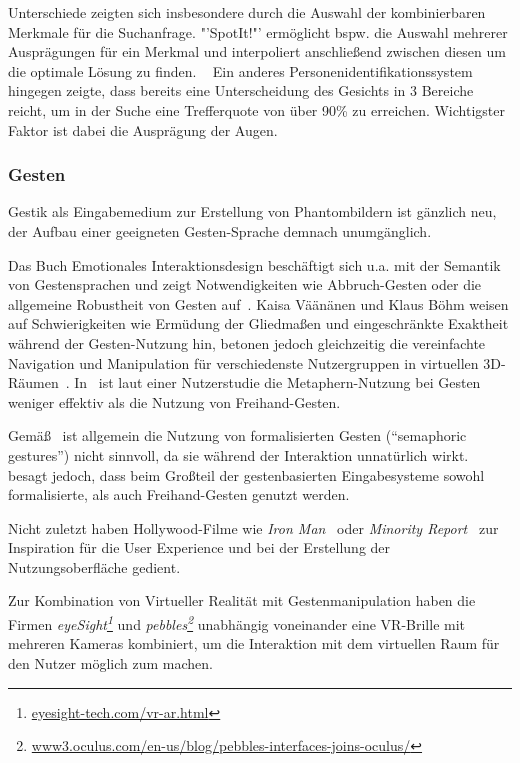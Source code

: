 \documentclass{sigchi-ext}
\begin{document}
Unterschiede zeigten sich insbesondere durch die Auswahl der
kombinierbaren Merkmale für die Suchanfrage. "'SpotIt!"' ermöglicht
bspw. die Auswahl mehrerer Ausprägungen für ein Merkmal und interpoliert anschließend zwischen diesen um die optimale Lösung zu finden. ~\cite{brunelli1996} Ein anderes Personenidentifikationssystem hingegen zeigte, dass bereits eine Unterscheidung des Gesichts in 3 Bereiche reicht, um in der Suche eine Trefferquote von über 90\% zu erreichen. Wichtigster Faktor ist dabei die Ausprägung der Augen. ~\cite{bobulski2012}

\subsubsection{Gesten}
Gestik als Eingabemedium zur Erstellung von Phantombildern ist gänzlich neu, der Aufbau einer geeigneten Gesten-Sprache demnach unumgänglich. 

Das Buch Emotionales Interaktionsdesign beschäftigt sich
 u.a. mit der Semantik von Gestensprachen und zeigt Notwendigkeiten wie Abbruch-Gesten oder die allgemeine Robustheit von Gesten auf~\cite{Dorau11}. Kaisa Väänänen und Klaus Böhm weisen auf Schwierigkeiten wie Ermüdung der Gliedma{\ss}en und eingeschränkte Exaktheit während der Gesten-Nutzung hin, betonen jedoch gleichzeitig die vereinfachte Navigation und Manipulation für verschiedenste Nutzergruppen in virtuellen 3D-Räumen~\cite{vrs:book}.
In~\cite{3dinteraction:book} ist laut einer Nutzerstudie die
Metaphern-Nutzung bei Gesten weniger effektiv als die Nutzung von
Freihand-Gesten. 

Gemä{\ss}~\cite{Quek:2002:MHD:568513.568514, Wexelblat:1997:RCG:647590.728557} ist allgemein die Nutzung von formalisierten Gesten (``semaphoric gestures'') nicht sinnvoll, da sie während der Interaktion unnatürlich wirkt.
~\cite{3dinteraction:book} besagt jedoch, dass beim Gro{\ss}teil der
gestenbasierten Eingabesysteme sowohl formalisierte, als auch
Freihand-Gesten genutzt werden.

Nicht zuletzt haben Hollywood-Filme wie \textit{Iron Man}~\cite{ironman:movie} oder \textit{Minority Report}~\cite{minorityreport:movie} zur Inspiration für die User Experience und bei der Erstellung der Nutzungsoberfläche gedient.

Zur Kombination von Virtueller Realität mit Gestenmanipulation haben die Firmen \textit{eyeSight\footnote{\url{eyesight-tech.com/vr-ar.html}}} und 
\textit{pebbles\footnote{\url{www3.oculus.com/en-us/blog/pebbles-interfaces-joins-oculus/}}} unabhängig voneinander eine VR-Brille mit mehreren Kameras kombiniert, um die Interaktion mit dem virtuellen Raum für den Nutzer möglich zum machen.
\end{document}
